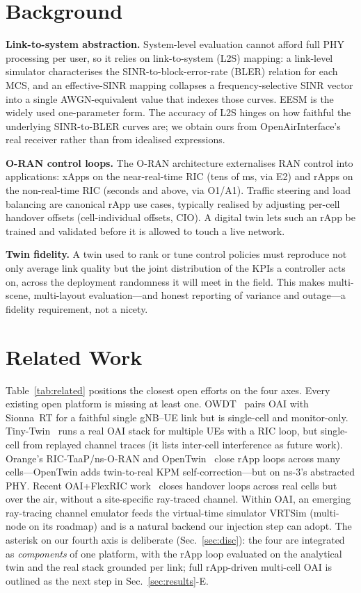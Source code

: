 \documentclass[conference]{IEEEtran}
\begin{document}
\section{Background}
\textbf{Link-to-system abstraction.} System-level evaluation cannot afford full PHY
processing per user, so it relies on link-to-system (L2S) mapping: a link-level
simulator characterises the SINR-to-block-error-rate (BLER) relation for each MCS,
and an effective-SINR mapping collapses a frequency-selective SINR vector into a
single AWGN-equivalent value that indexes those curves. EESM is the widely used
one-parameter form. The accuracy of L2S hinges on how faithful the underlying
SINR-to-BLER curves are; we obtain ours from OpenAirInterface's real receiver
rather than from idealised expressions.

\textbf{O-RAN control loops.} The O-RAN architecture externalises RAN control into
applications: xApps on the near-real-time RIC (tens of ms, via E2) and rApps on the
non-real-time RIC (seconds and above, via O1/A1). Traffic steering and load
balancing are canonical rApp use cases, typically realised by adjusting per-cell
handover offsets (cell-individual offsets, CIO). A digital twin lets such an rApp be
trained and validated before it is allowed to touch a live network.

\textbf{Twin fidelity.} A twin used to rank or tune control policies must reproduce
not only average link quality but the joint distribution of the KPIs a controller
acts on, across the deployment randomness it will meet in the field. This makes
multi-scene, multi-layout evaluation---and honest reporting of variance and
outage---a fidelity requirement, not a nicety.

\section{Related Work}
Table~\ref{tab:related} positions the closest open efforts on the four axes.
Every existing open platform is missing at least one. OWDT~\cite{owdt} pairs OAI
with Sionna~RT for a faithful single gNB--UE link but is single-cell and
monitor-only. Tiny-Twin~\cite{tinytwin} runs a real OAI stack for multiple UEs with
a RIC loop, but single-cell from replayed channel traces (it lists inter-cell
interference as future work). Orange's RIC-TaaP/ns-O-RAN and OpenTwin~\cite{opentwin}
close rApp loops across many cells---OpenTwin adds twin-to-real KPM
self-correction---but on ns-3's abstracted PHY. Recent OAI+FlexRIC
work~\cite{oaiho} closes handover loops across real cells but over the air, without
a site-specific ray-traced channel. Within OAI, an emerging ray-tracing channel
emulator feeds the virtual-time simulator VRTSim (multi-node on its roadmap) and is
a natural backend our injection step can adopt. The asterisk on our fourth axis is
deliberate (Sec.~\ref{sec:disc}): the four are integrated as \emph{components} of
one platform, with the rApp loop evaluated on the analytical twin and the real
stack grounded per link; full rApp-driven multi-cell OAI is outlined as the next
step in Sec.~\ref{sec:results}-E.
\end{document}
